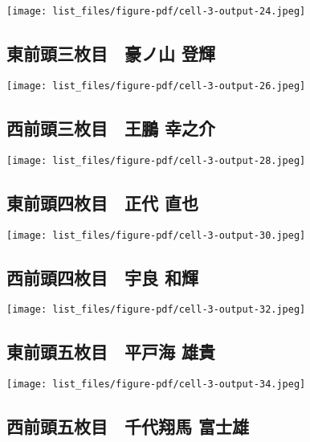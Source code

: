 \documentclass[
]{bxjsarticle}
\begin{document}
\texttt{[image: list\_files/figure-pdf/cell-3-output-24.jpeg]}

\subsection{東前頭三枚目　豪ノ山
登輝}\label{ux6771ux524dux982dux4e09ux679aux76ee-ux8c6aux30ceux5c71-ux767bux8f1d}

\texttt{[image: list\_files/figure-pdf/cell-3-output-26.jpeg]}

\subsection{西前頭三枚目　王鵬
幸之介}\label{ux897fux524dux982dux4e09ux679aux76ee-ux738bux9d6c-ux5e78ux4e4bux4ecb}

\texttt{[image: list\_files/figure-pdf/cell-3-output-28.jpeg]}

\subsection{東前頭四枚目　正代
直也}\label{ux6771ux524dux982dux56dbux679aux76ee-ux6b63ux4ee3-ux76f4ux4e5f}

\texttt{[image: list\_files/figure-pdf/cell-3-output-30.jpeg]}

\subsection{西前頭四枚目　宇良
和輝}\label{ux897fux524dux982dux56dbux679aux76ee-ux5b87ux826f-ux548cux8f1d}

\texttt{[image: list\_files/figure-pdf/cell-3-output-32.jpeg]}

\subsection{東前頭五枚目　平戸海
雄貴}\label{ux6771ux524dux982dux4e94ux679aux76ee-ux5e73ux6238ux6d77-ux96c4ux8cb4}

\texttt{[image: list\_files/figure-pdf/cell-3-output-34.jpeg]}

\subsection{西前頭五枚目　千代翔馬
富士雄}\label{ux897fux524dux982dux4e94ux679aux76ee-ux5343ux4ee3ux7fd4ux99ac-ux5bccux58ebux96c4}
\end{document}

